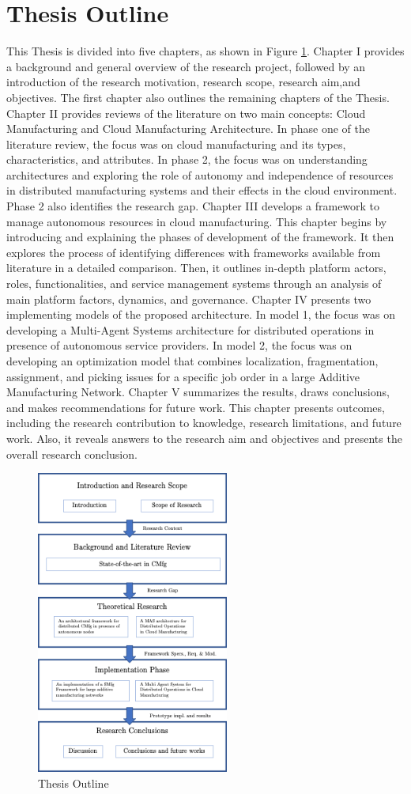 \section{Thesis Outline}
This Thesis is divided into five chapters, as shown in Figure \ref{fig:thesis-outline}. Chapter I provides a background and general overview of the research project, followed by an introduction of the research motivation, research scope, research aim,and objectives. The first chapter also outlines the remaining chapters of the Thesis. Chapter II provides reviews of the literature on two main concepts: Cloud Manufacturing and Cloud Manufacturing Architecture. In phase one of the literature review, the focus was on cloud manufacturing and its types, characteristics, and attributes. In phase 2, the focus was on understanding architectures and exploring the role of autonomy and independence of resources in distributed manufacturing systems and their effects in the cloud environment. Phase 2 also identifies the research gap. Chapter III develops a framework to manage autonomous resources in cloud manufacturing. This chapter begins by introducing and explaining the phases of development of the framework. It then explores the process of identifying differences with frameworks available from literature in a detailed comparison. Then, it outlines in-depth platform actors, roles, functionalities, and service management systems through an analysis of main platform factors, dynamics, and governance. Chapter IV presents two implementing models of the proposed architecture. In model 1, the focus was on developing a Multi-Agent Systems architecture for distributed operations in presence of autonomous service providers. In model 2, the focus was on developing an optimization model that combines localization, fragmentation, assignment, and picking issues for a specific job order in a large Additive Manufacturing Network. Chapter V summarizes the results, draws conclusions, and makes recommendations for future work. This chapter presents outcomes, including the research contribution to knowledge, research limitations, and future work. Also, it reveals answers to the research aim and objectives and presents the overall research conclusion.

\begin{figure}[h]
    \centering
    \includegraphics[height=10cm, keepaspectratio]{images/thesis-outline.png}
    \caption{Thesis Outline}
    \label{fig:thesis-outline}
\end{figure}
